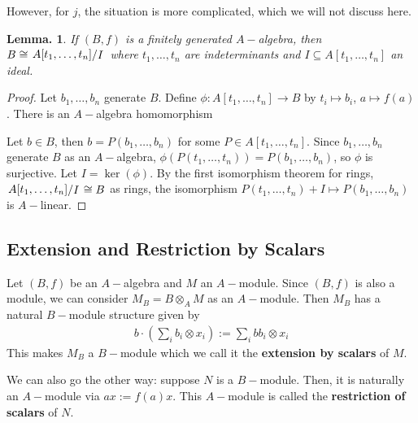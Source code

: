 \documentclass[11pt, a4paper]{memoir}
\theoremstyle{change}
\newtheorem{lemma}[theorem]{Lemma.}
\theoremstyle{plain}
\theoremstyle{nonumberplain}
\newtheorem{proof}{Proof}
\newcommand{\quot}[2]{\mathchoice{\left.\raisebox{0.10em}{$#1$}\middle/\raisebox{-0.10em}{$#2$}\right.}
                                 {\left.\raisebox{0.04em}{$#1$}\middle/\raisebox{-0.04em}{$#2$}\right.}
                                 {\left.\raisebox{0.01em}{$#1$}\middle/\raisebox{-0.01em}{$#2$}\right.}
                                 {\left.\raisebox{0em}{$#1$}\middle/\raisebox{0em}{$#2$}\right.}}
\numberwithin{equation}{section}
\begin{document}
However, for $j$, the situation is more complicated, which we will not discuss here.
\begin{lemma}
    If $(B,f)$ is a finitely generated $A-$algebra, then $B\cong\quot{A[t_1,\ldots,t_n]}{I}$ where $t_1,\ldots,t_n$ are indeterminants and $I\subseteq A[t_1,\ldots,t_n]$ an ideal.
\end{lemma}
\begin{proof}
    Let $b_1,\ldots,b_n$ generate $B$.
    Define $\phi:A[t_1,\ldots,t_n]\to B$ by $t_i\mapsto b_i$, $a\mapsto f(a)$.
    There is an $A-$algebra homomorphism
    \begin{center}
    \end{center}
    Let $b\in B$, then $b=P(b_1,\ldots,b_n)$ for some $P\in A[t_1,\ldots,t_n]$.
    Since $b_1,\ldots,b_n$ generate $B$ as an $A-$algebra, $\phi(P(t_1,\ldots,t_n))=P(b_1,\ldots,b_n)$, so $\phi$ is surjective.
    Let $I=\ker(\phi)$.
    By the first isomorphism theorem for rings, $\quot{A[t_1,\ldots,t_n]}{I}\cong B$ as rings, the isomorphism $P(t_1,\ldots,t_n)+I\mapsto P(b_1,\ldots,b_n)$ is $A-$linear.
\end{proof}
\subsection{Extension and Restriction by Scalars}
Let $(B,f)$ be an $A-$algebra and $M$ an $A-$module.
Since $(B,f)$ is also a module, we can consider $M_B=B\otimes_A M$ as an $A-$module.
Then $M_B$ has a natural $B-$module structure given by
\begin{align*}
    b\cdot\left(\sum_i b_i\otimes x_i\right):=\sum_i bb_i\otimes x_i
\end{align*}
This makes $M_B$ a $B-$module which we call it the \textbf{extension by scalars} of $M$.

We can also go the other way: suppose $N$ is a $B-$module.
Then, it is naturally an $A-$module via $ax:=f(a)x$.
This $A-$module is called the \textbf{restriction of scalars} of $N$.
\end{document}
